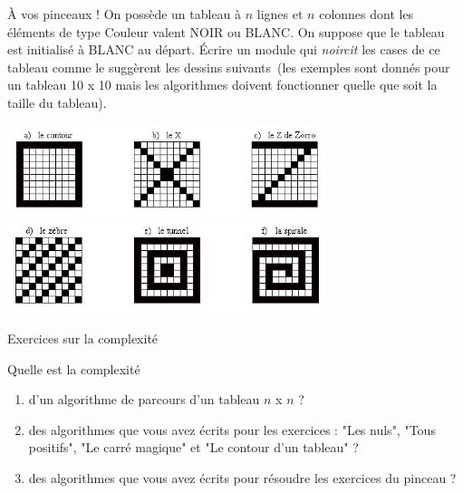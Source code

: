 \begin{Exercice}{À vos pinceaux !}
	On possède un tableau à $n$ lignes et $n$ colonnes dont les éléments de type
	Couleur valent NOIR ou BLANC. On suppose que le tableau est initialisé
	à BLANC au départ. Écrire un module qui \emph{noircit} les cases de ce
	tableau comme le suggèrent les dessins suivants~(les exemples sont
	donnés pour un tableau 10 x 10 mais les algorithmes doivent fonctionner
	quelle que soit la taille du tableau).
	
	\begin{center}
	\includegraphics[width=0.7\textwidth]{image/tab2d-ex-oxz}
	\includegraphics[width=0.7\textwidth]{image/tab2d-ex-zts}
	\end{center}
\end{Exercice}

\begin{Exercice}{Exercices sur la complexité}

	Quelle est la complexité 
	\begin{enumerate}[label=\alph*)]
	\item 
		d’un algorithme de parcours	d'un tableau $n$ x $n$ ?
	\item
		des algorithmes que vous avez écrits pour les exercices :
		"Les nuls", "Tous positifs", "Le carré magique"
		et "Le contour d'un tableau" ?
	\item 
		des algorithmes que vous avez écrits pour résoudre les
		exercices du pinceau ?
	\end{enumerate}
\end{Exercice}


